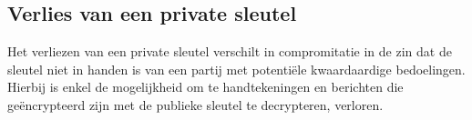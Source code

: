 \subsection{Verlies van een private sleutel}
\label{subsec:verlies-van-een-private-sleutel}
Het verliezen van een private sleutel verschilt in compromitatie in de zin dat
de sleutel niet in handen is van een partij met potentiële kwaardaardige
bedoelingen. Hierbij is enkel de mogelijkheid om te handtekeningen en berichten
die geëncrypteerd zijn met de publieke sleutel te decrypteren, verloren.
